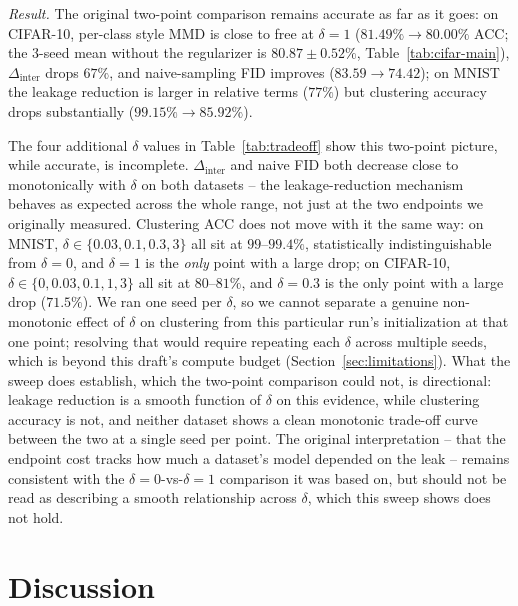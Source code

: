 \documentclass[10pt,letterpaper]{article}
\begin{document}
\emph{Result.} The original two-point comparison remains accurate as far as
it goes: on CIFAR-10, per-class style MMD is close to free at $\delta{=}1$
($81.49\%\to80.00\%$ ACC; the 3-seed mean without the regularizer is
$80.87\pm0.52\%$, Table~\ref{tab:cifar-main}), $\Delta_{\mathrm{inter}}$
drops $67\%$, and naive-sampling FID improves ($83.59\to74.42$); on MNIST
the leakage reduction is larger in relative terms ($77\%$) but clustering
accuracy drops substantially ($99.15\%\to85.92\%$).

The four additional $\delta$ values in Table~\ref{tab:tradeoff} show this
two-point picture, while accurate, is incomplete. $\Delta_{\mathrm{inter}}$
and naive FID both decrease close to monotonically with $\delta$ on both
datasets -- the leakage-reduction mechanism behaves as expected across the
whole range, not just at the two endpoints we originally measured. Clustering
ACC does not move with it the same way: on MNIST, $\delta\in\{0.03,0.1,0.3,3\}$
all sit at $99$--$99.4\%$, statistically indistinguishable from $\delta{=}0$,
and $\delta{=}1$ is the \emph{only} point with a large drop; on CIFAR-10,
$\delta\in\{0,0.03,0.1,1,3\}$ all sit at $80$--$81\%$, and $\delta{=}0.3$ is
the only point with a large drop ($71.5\%$). We ran one seed per $\delta$,
so we cannot separate a genuine non-monotonic effect of $\delta$ on
clustering from this particular run's initialization at that one point;
resolving that would require repeating each $\delta$ across multiple seeds,
which is beyond this draft's compute budget (Section~\ref{sec:limitations}).
What the sweep does establish, which the two-point comparison could not, is
directional: leakage reduction is a smooth function of $\delta$ on this
evidence, while clustering accuracy is not, and neither dataset shows a
clean monotonic trade-off curve between the two at a single seed per point.
The original interpretation -- that the endpoint cost tracks how much a
dataset's model depended on the leak -- remains consistent with the
$\delta{=}0$-vs-$\delta{=}1$ comparison it was based on, but should not be
read as describing a smooth relationship across $\delta$, which this sweep
shows does not hold.

\section{Discussion}
\label{sec:discussion}
\end{document}
